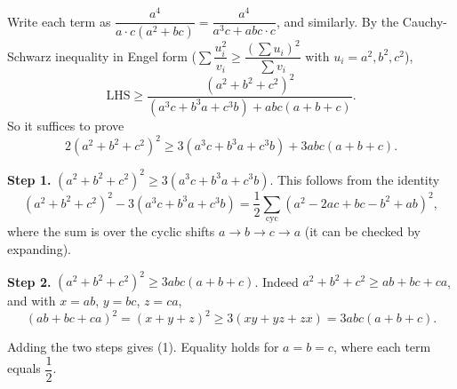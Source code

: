 Write each term as $\dfrac{a^4}{a\cdot c(a^2+bc)}=\dfrac{a^4}{a^3c+abc\cdot c}$, and similarly. By the Cauchy-Schwarz inequality in Engel form ($\sum\dfrac{u_i^2}{v_i}\ge\dfrac{(\sum u_i)^2}{\sum v_i}$ with $u_i=a^2,b^2,c^2$),
\[\text{LHS}\ge\dfrac{(a^2+b^2+c^2)^2}{(a^3c+b^3a+c^3b)+abc(a+b+c)}.\]
So it suffices to prove
\[2(a^2+b^2+c^2)^2\ge3(a^3c+b^3a+c^3b)+3abc(a+b+c). \tag{1}\]

\textbf{Step 1.} $(a^2+b^2+c^2)^2\ge3(a^3c+b^3a+c^3b)$. This follows from the identity
\[(a^2+b^2+c^2)^2-3(a^3c+b^3a+c^3b)=\dfrac{1}{2}\sum_{\mathrm{cyc}}\left(a^2-2ac+bc-b^2+ab\right)^2,\]
where the sum is over the cyclic shifts $a\to b\to c\to a$ (it can be checked by expanding).

\textbf{Step 2.} $(a^2+b^2+c^2)^2\ge3abc(a+b+c)$. Indeed $a^2+b^2+c^2\ge ab+bc+ca$, and with $x=ab$, $y=bc$, $z=ca$,
\[(ab+bc+ca)^2=(x+y+z)^2\ge3(xy+yz+zx)=3abc(a+b+c).\]

Adding the two steps gives (1). Equality holds for $a=b=c$, where each term equals $\dfrac{1}{2}$.
